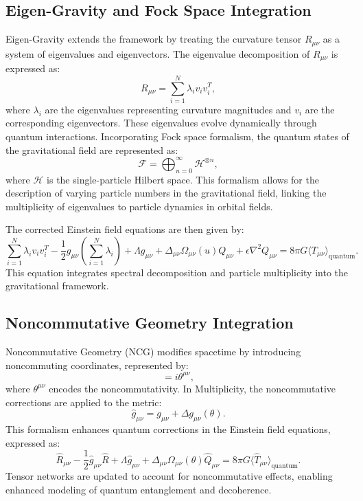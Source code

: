 \documentclass[12]{amsart}
\theoremstyle{plain}
\begin{document}
\subsection{Eigen-Gravity and Fock Space Integration}
Eigen-Gravity extends the framework by treating the curvature tensor \( R_{\mu\nu} \) as a system of eigenvalues and eigenvectors. The eigenvalue decomposition of \( R_{\mu\nu} \) is expressed as:
\begin{equation}
    R_{\mu\nu} = \sum_{i=1}^{N} \lambda_i v_i v_i^T,
\end{equation}
where \( \lambda_i \) are the eigenvalues representing curvature magnitudes and \( v_i \) are the corresponding eigenvectors. These eigenvalues evolve dynamically through quantum interactions. Incorporating Fock space formalism, the quantum states of the gravitational field are represented as:
\begin{equation}
    \mathcal{F} = \bigoplus_{n=0}^{\infty} \mathcal{H}^{\otimes n},
\end{equation}
where \( \mathcal{H} \) is the single-particle Hilbert space. This formalism allows for the description of varying particle numbers in the gravitational field, linking the multiplicity of eigenvalues to particle dynamics in orbital fields.

The corrected Einstein field equations are then given by:
\begin{equation}
    \sum_{i=1}^{N} \lambda_i v_i v_i^T - \frac{1}{2} g_{\mu\nu} \left( \sum_{i=1}^{N} \lambda_i \right) + \Lambda g_{\mu\nu} + \Delta_{\mu\nu}\Omega_{\mu\nu}(u)Q_{\mu\nu} + \epsilon \nabla^2 Q_{\mu\nu} = 8\pi G \langle T_{\mu\nu} \rangle_{\text{quantum}}.
\end{equation}
This equation integrates spectral decomposition and particle multiplicity into the gravitational framework.
\subsection{Noncommutative Geometry Integration}
Noncommutative Geometry (NCG) modifies spacetime by introducing noncommuting coordinates, represented by:
\begin{equation}
    [\hat{x}^\mu, \hat{x}^\nu] = i \theta^{\mu\nu},
\end{equation}
where \( \theta^{\mu\nu} \) encodes the noncommutativity. In Multiplicity, the noncommutative corrections are applied to the metric:
\begin{equation}
    \hat{g}_{\mu\nu} = g_{\mu\nu} + \Delta g_{\mu\nu}(\theta).
\end{equation}
This formalism enhances quantum corrections in the Einstein field equations, expressed as:
\begin{equation}
    \hat{R}_{\mu\nu} - \frac{1}{2} \hat{g}_{\mu\nu} \hat{R} + \Lambda \hat{g}_{\mu\nu} + \Delta_{\mu\nu}\Omega_{\mu\nu}(\theta) \hat{Q}_{\mu\nu} = 8\pi G \langle \hat{T}_{\mu\nu} \rangle_{\text{quantum}}.
\end{equation}
Tensor networks are updated to account for noncommutative effects, enabling enhanced modeling of quantum entanglement and decoherence.
\end{document}
